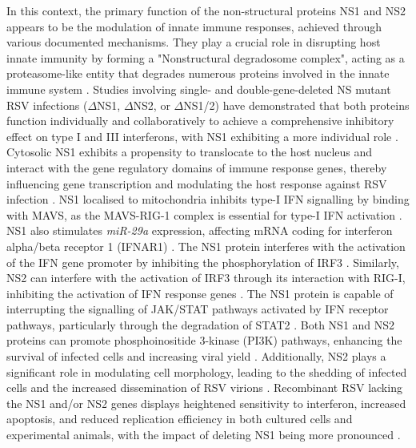 In this context, the primary function of the non-structural proteins NS1 and NS2 appears to be the modulation of innate immune responses, achieved through various documented mechanisms. They play a crucial role in disrupting host innate immunity by forming a "Nonstructural degradosome complex", acting as a proteasome-like entity that degrades numerous proteins involved in the innate immune system \cite{Boyoglu-Barnum2019BiologyDevelopment.}. Studies involving single- and double-gene-deleted NS mutant RSV infections (\(\Delta\)NS1, \(\Delta\)NS2, or \(\Delta\)NS1/2) have demonstrated that both proteins function individually and collaboratively to achieve a comprehensive inhibitory effect on type I and III interferons, with NS1 exhibiting a more individual role \cite{Sedeyn2019RespiratoryResponses, Spann2004SuppressionMacrophages}. Cytosolic NS1 exhibits a propensity to translocate to the host nucleus and interact with the gene regulatory domains of immune response genes, thereby influencing gene transcription and modulating the host response against RSV infection \cite{Pei2021Nuclear-localizedTranscription}. NS1 localised to mitochondria inhibits type-I IFN signalling by binding with MAVS, as the MAVS-RIG-1 complex is essential for type-I IFN activation \cite{Boyapalle2012RespiratoryInfection}. NS1 also stimulates \textit{miR-29a} expression, affecting mRNA coding for interferon alpha/beta receptor 1 (IFNAR1) \cite{Sedeyn2019RespiratoryResponses, Zhang2016RespiratoryReceptor}. The NS1 protein interferes with the activation of the IFN gene promoter by inhibiting the phosphorylation of IRF3 \cite{Spann2005EffectsCytokines}. Similarly, NS2 can interfere with the activation of IRF3 through its interaction with RIG-I, inhibiting the activation of IFN response genes \cite{Wright2006TheHumans}. The NS1 protein is capable of interrupting the signalling of JAK/STAT pathways activated by IFN receptor pathways, particularly through the degradation of STAT2 \cite{Wright2006TheHumans, Sedeyn2019RespiratoryResponses}. Both NS1 and NS2 proteins can promote phosphoinositide 3-kinase (PI3K) pathways, enhancing the survival of infected cells and increasing viral yield \cite{Wu2012TheBiology.}. Additionally, NS2 plays a significant role in modulating cell morphology, leading to the shedding of infected cells and the increased dissemination of RSV virions \cite{Sedeyn2019RespiratoryResponses, Liesman2014RSV-encodedObstruction}. Recombinant RSV lacking the NS1 and/or NS2 genes displays heightened sensitivity to interferon, increased apoptosis, and reduced replication efficiency in both cultured cells and experimental animals, with the impact of deleting NS1 being more pronounced \cite{Whitehead1999RecombinantChimpanzees, Teng2000RecombinantChimpanzees}.

